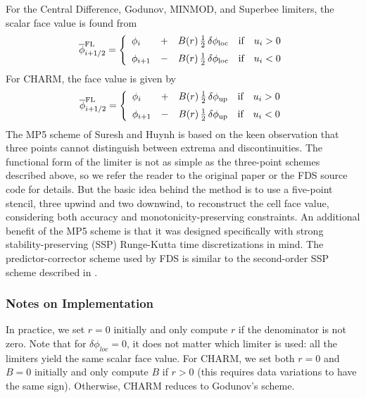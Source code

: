 \noindent For the Central Difference, Godunov, MINMOD, and Superbee limiters, the scalar face value is found from
\begin{equation}
\label{eqn_flux_limiter}
\overline{\phi}^{\rm FL}_{i+1/2} = \left\{ \begin{array}{lcll} \phi_i &+& B(r) \,\frac{1}{2} \,\delta \phi_{\rm loc} & \mbox{if} \quad u_i>0 \vspace{0.2 cm}\\
\phi_{i+1} &-& B(r) \,\frac{1}{2} \,\delta \phi_{\rm loc} & \mbox{if} \quad u_i<0 \end{array} \right.
\end{equation}
For CHARM, the face value is given by~\cite{Kempf:2003}
\begin{equation}
\label{eqn_charm_limiter}
\overline{\phi}^{\rm FL}_{i+1/2} = \left\{ \begin{array}{lcll} \phi_i &+& B(r) \,\frac{1}{2} \,\delta \phi_{\rm up} & \mbox{if} \quad u_i>0 \vspace{0.2 cm}\\
\phi_{i+1} &-& B(r) \,\frac{1}{2} \,\delta \phi_{\rm up} & \mbox{if} \quad u_i<0 \end{array} \right.
\end{equation}
The MP5 scheme of Suresh and Huynh \cite{Suresh:1997} is based on the keen observation that three points cannot distinguish between extrema and discontinuities.  The functional form of the limiter is not as simple as the three-point schemes described above, so we refer the reader to the original paper or the FDS source code for details.  But the basic idea behind the method is to use a five-point stencil, three upwind and two downwind, to reconstruct the cell face value, considering both accuracy and monotonicity-preserving constraints.  An additional benefit of the MP5 scheme is that it was designed specifically with strong stability-preserving (SSP) Runge-Kutta time discretizations in mind.  The predictor-corrector scheme used by FDS is similar to the second-order SSP scheme described in \cite{Gottlieb:2001}.


\subsubsection{Notes on Implementation}

In practice, we set $r=0$ initially and only compute $r$ if the denominator is not zero.  Note that for $\delta \phi_{loc}=0$, it does not matter which limiter is used: all the limiters yield the same scalar face value.  For CHARM, we set both $r=0$ and $B=0$ initially and only compute $B$ if $r>0$ (this requires data variations to have the same sign). Otherwise, CHARM reduces to Godunov's scheme.

